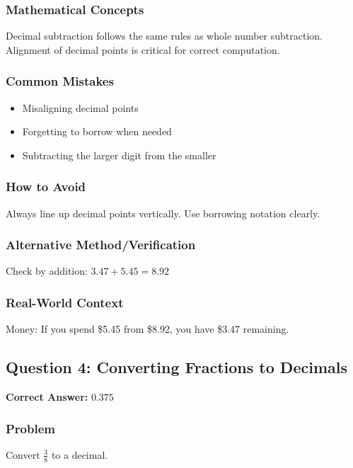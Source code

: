 \documentclass[12pt,a4paper]{article}
\begin{document}
\subsubsection*{Mathematical Concepts}
Decimal subtraction follows the same rules as whole number subtraction. Alignment of decimal points is critical for correct computation.

\subsubsection*{Common Mistakes}
\begin{itemize}
    \item Misaligning decimal points
    \item Forgetting to borrow when needed
    \item Subtracting the larger digit from the smaller
\end{itemize}

\subsubsection*{How to Avoid}
Always line up decimal points vertically. Use borrowing notation clearly.

\subsubsection*{Alternative Method/Verification}
Check by addition: $3.47 + 5.45 = 8.92$ 

\subsubsection*{Real-World Context}
Money: If you spend \$5.45 from \$8.92, you have \$3.47 remaining.

\vspace{0.5cm}

\subsection*{Question 4: Converting Fractions to Decimals}

\textbf{Correct Answer:} $0.375$

\subsubsection*{Problem}
Convert $\frac{3}{8}$ to a decimal.
\end{document}
